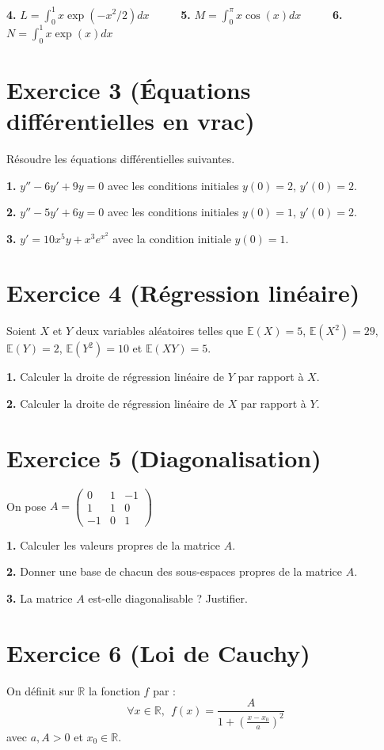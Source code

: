 \documentclass[5pt]{article}
\newcommand{\E}{\mathbb{E}}
\begin{document}
\textbf{4.} $L=\int_0^1 x \exp{(-x^2/2)} dx$ \ \ \ \ \ \textbf{5.} $M=\int_0^{\pi} x \cos(x) dx$ \ \ \ \ \ \textbf{6.} $N = \int_0^1 x \exp{(x)} dx$

\section*{Exercice 3 (Équations différentielles en vrac)}

Résoudre les équations différentielles suivantes.

\textbf{1.} $y'' -6y' +9y = 0$ avec les conditions initiales $y(0)=2$, $y'(0)=2$.

\textbf{2.} $y'' -5y' +6y = 0$ avec les conditions initiales $y(0)=1$, $y'(0)=2$.

\textbf{3.} $y' = 10x^5 y + x^3 e^{x^2}$ avec la condition initiale $y(0)=1$.

\section*{Exercice 4 (Régression linéaire)}

Soient $X$ et $Y$ deux variables aléatoires telles que $\E (X)=5$, $\E(X^2) = 29$, $\E (Y)=2$, $\E(Y^2) = 10$ et $\E (XY) =5$. 

\textbf{1.} Calculer la droite de régression linéaire de $Y$ par rapport à $X$.

\textbf{2.} Calculer la droite de régression linéaire de $X$ par rapport à $Y$.

\section*{Exercice 5 (Diagonalisation)}

On pose $A = \begin{pmatrix}
0 & 1 & -1 \\
1 & 1 & 0 \\
-1 & 0 & 1
\end{pmatrix}$

\textbf{1.} Calculer les valeurs propres de la matrice $A$.

\textbf{2.} Donner une base de chacun des sous-espaces propres de la matrice $A$.

\textbf{3.} La matrice $A$ est-elle diagonalisable ? Justifier.

\section*{Exercice 6 (Loi de Cauchy)}
On définit sur $\mathbb{R}$ la fonction $f$ par : 
$$\forall x \in \mathbb{R}, \ \ f(x)=\frac{A}{1+\left( \frac{x-x_0}{a}  \right)^2}$$ 
avec $a, A >0$ et $x_0 \in \mathbb{R}$.\\
\end{document}
